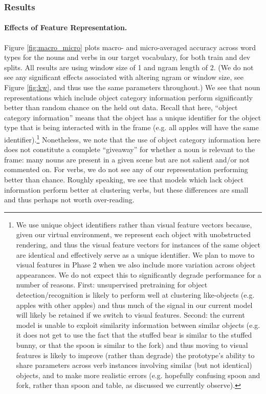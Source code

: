 \documentclass[11pt]{article}
\begin{document}
\subsubsection{Results}

\paragraph{Effects of Feature Representation.} Figure \ref{fig:macro_micro} plots macro- and micro-averaged accuracy across word types for the nouns and verbs in our target vocabulary, for both train and dev splits. All results are using window size of 1 and ngram length of 2. (We do not see any significant effects associated with altering ngram or window size, see Figure \ref{fig:kw}, and thus use the same parameters throughout.) We see that noun representations which include object category information perform significantly better than random chance on the held out data. Recall that here, ``object category information'' means that the object has a unique identifier for the object type that is being interacted with in the frame (e.g. all apples will have the same identifier).\footnote{We use unique object identifiers rather than visual feature vectors because, given our virtual environment, we represent each object with unobstructed rendering, and thus the visual feature vectors for instances of the same object are identical and effectively serve as a unique identifier. We plan to move to visual features in Phase 2 when we also include more variation across object appearances. We do not expect this to significantly degrade performance for a number of reasons. First: unsupervised pretraining for object detection/recognition is likely to perform well at clustering like-objects (e.g. apples with other apples) and thus much of the signal in our current model will likely be retained if we switch to visual features. Second: the current model is unable to exploit similarity information between similar objects (e.g. it does not get to use the fact that the stuffed bear is similar to the stuffed bunny, or that the spoon is similar to the fork) and thus moving to visual features is likely to improve (rather than degrade) the prototype's ability to share parameters across verb instances involving similar (but not identical) objects, and to make more realistic errors (e.g. hopefully confusing spoon and fork, rather than spoon and table, as discussed we currently observe).}
Nonetheless, we note that the use of object category information here does not constitute a complete ``giveaway'' for whether a noun is relevant to the frame: many nouns are present in a given scene but are not salient and/or not commented on. For verbs, we do not see any of our representation performing better than chance. Roughly speaking, we see that models which lack object information perform better at clustering verbs, but these differences are small and thus perhaps not worth over-reading.
\end{document}
